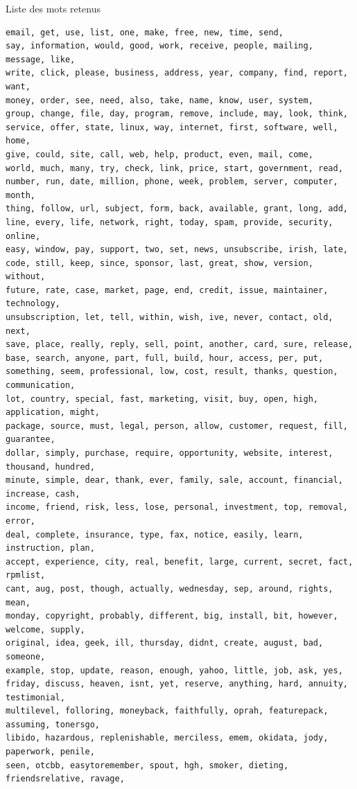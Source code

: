 \documentclass[a4paper,12pt]{article}
\begin{document}
	Liste des mots retenus
	\begin{verbatim}
email, get, use, list, one, make, free, new, time, send, 
say, information, would, good, work, receive, people, mailing, message, like, 
write, click, please, business, address, year, company, find, report, want, 
money, order, see, need, also, take, name, know, user, system, 
group, change, file, day, program, remove, include, may, look, think, 
service, offer, state, linux, way, internet, first, software, well, home, 
give, could, site, call, web, help, product, even, mail, come, 
world, much, many, try, check, link, price, start, government, read, 
number, run, date, million, phone, week, problem, server, computer, month, 
thing, follow, url, subject, form, back, available, grant, long, add, 
line, every, life, network, right, today, spam, provide, security, online, 
easy, window, pay, support, two, set, news, unsubscribe, irish, late, 
code, still, keep, since, sponsor, last, great, show, version, without, 
future, rate, case, market, page, end, credit, issue, maintainer, technology, 
unsubscription, let, tell, within, wish, ive, never, contact, old, next, 
save, place, really, reply, sell, point, another, card, sure, release, 
base, search, anyone, part, full, build, hour, access, per, put, 
something, seem, professional, low, cost, result, thanks, question, communication, 
lot, country, special, fast, marketing, visit, buy, open, high, application, might, 
package, source, must, legal, person, allow, customer, request, fill, guarantee, 
dollar, simply, purchase, require, opportunity, website, interest, thousand, hundred, 
minute, simple, dear, thank, ever, family, sale, account, financial, increase, cash, 
income, friend, risk, less, lose, personal, investment, top, removal, error, 
deal, complete, insurance, type, fax, notice, easily, learn, instruction, plan, 
accept, experience, city, real, benefit, large, current, secret, fact, rpmlist, 
cant, aug, post, though, actually, wednesday, sep, around, rights, mean, 
monday, copyright, probably, different, big, install, bit, however, welcome, supply, 
original, idea, geek, ill, thursday, didnt, create, august, bad, someone, 
example, stop, update, reason, enough, yahoo, little, job, ask, yes, 
friday, discuss, heaven, isnt, yet, reserve, anything, hard, annuity, testimonial, 
multilevel, folloring, moneyback, faithfully, oprah, featurepack, assuming, tonersgo, 
libido, hazardous, replenishable, merciless, emem, okidata, jody, paperwork, penile, 
seen, otcbb, easytoremember, spout, hgh, smoker, dieting, friendsrelative, ravage, 

\end{verbatim}
\end{document}
